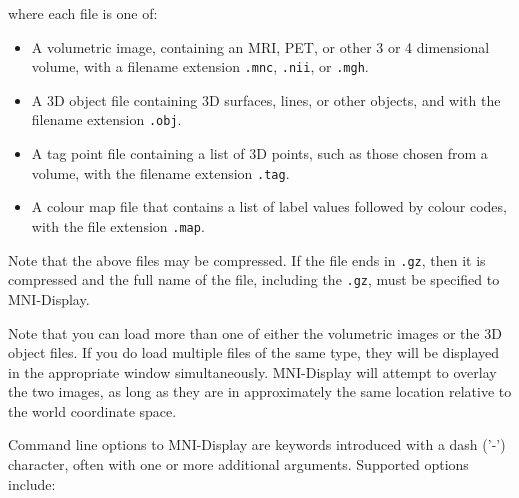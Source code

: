 \documentclass[11pt,letterpaper]{article}
\newcommand{\ident}[1]{{\tt #1}}
\newcommand{\display}{\mbox{MNI-Display}}
\begin{document}
where each file is one of:

\vspace{.5cm}

\begin{itemize}
\item A volumetric image, containing an MRI, PET, or other 3 or 4 dimensional volume, with a filename extension \ident{.mnc}, \ident{.nii}, or \ident{.mgh}.

\item A 3D object file containing 3D surfaces, lines, or other objects, and
with the filename extension \ident{.obj}.

\item A tag point file containing a list of 3D points, such as those chosen from a volume, with the filename extension \ident{.tag}.

\item A colour map file that contains a list of label values followed by colour 
codes, with the file extension \ident{.map}.
\end{itemize}

Note that the above files may be compressed.  If the file ends in
\ident{.gz}, then it is compressed and the full name of the file, including the
\ident{.gz}, must be specified to \display{}.

Note that you can load more than one of either the volumetric images or
the 3D object files. If you do load multiple files of the same type,
they will be displayed in the appropriate window
simultaneously. \display{} will attempt to overlay the two images, as
long as they are in approximately the same location relative to the
world coordinate space.

Command line options to \display{} are keywords introduced with a dash
('-') character, often with one or more additional arguments. Supported
options include:
\end{document}
